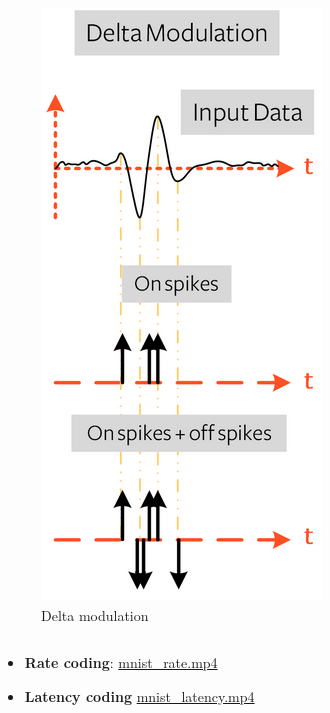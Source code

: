 \begin{frame}[allowframebreaks]
\begin{columns}
\begin{figure}
				\includegraphics[width=\linewidth]{images/deltaModulation}
				\caption{Delta modulation}
				\label{fig:deltamodulation}
			\end{figure}
	\end{columns}

	\begin{itemize}
		\item \textbf{Rate coding}: \href{./videos/mnist_rate.mp4}{mnist\_rate.mp4}
		\item \textbf{Latency coding} \href{./videos/mnist_latency.mp4}{mnist\_latency.mp4}
	\end{itemize}
\end{frame}


